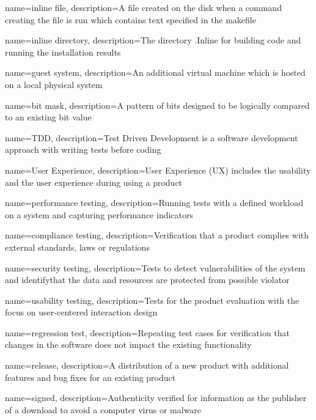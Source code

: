 {
    name={inline file},
    description={A file created on the disk when a command creating the file is run which contains text specified in the makefile}
}

{
    name={inline directory},
    description={The directory .Inline for building code and running the installation results}
}

{
    name={guest system},
    description={An additional virtual machine which is hosted on a local physical system}
}

{
    name={bit mask},
    description={A pattern of bits designed to be logically compared to an existing bit value}
}

{
    name={TDD},
    description={Test Driven Development is a software development approach with writing tests before coding}
}

{
    name={User Experience},
    description={User Experience (UX) includes the usability and the user experience during using a product}
}

{
    name={performance testing},
    description={Running tests with a defined workload on a system and capturing performance indicators}
}

{
    name={compliance testing},
    description={Verification that a product complies with external standards, laws or regulations}
}

{
    name={security testing},
    description={Tests to detect vulnerabilities of the system and identifythat the data and resources are protected from possible violator}
}

{
    name={usability testing},
    description={Tests for the product evaluation with the focus on user-centered interaction design}
}

{
    name={regression test},
    description={Repeating test cases for verification that changes in the software does not impact the existing functionality}
}

{
    name={release},
    description={A distribution of a new product with additional features and bug fixes for an existing product}
}

{
    name={signed},
    description={Authenticity verified for information as the publisher of a download to avoid a computer virus or malware}
}

